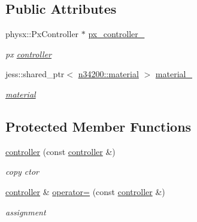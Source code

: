 \subsection*{Public Attributes}
\begin{DoxyCompactItemize}
\item 
physx::PxController $\ast$ \hyperlink{classnebula_1_1content_1_1actor_1_1physics_1_1controller_aba11f4ca929373b52f513b6b6309446a}{px\_\-controller\_\-}
\begin{DoxyCompactList}\small\item\em px \hyperlink{classnebula_1_1content_1_1actor_1_1physics_1_1controller}{controller} \item\end{DoxyCompactList}\item 
jess::shared\_\-ptr$<$ \hyperlink{classnebula_1_1content_1_1actor_1_1physics_1_1material}{n34200::material} $>$ \hyperlink{classnebula_1_1content_1_1actor_1_1physics_1_1controller_a58d0b48b283a21a2c8480f803a009351}{material\_\-}
\begin{DoxyCompactList}\small\item\em \hyperlink{classnebula_1_1content_1_1actor_1_1physics_1_1material}{material} \item\end{DoxyCompactList}\end{DoxyCompactItemize}
\subsection*{Protected Member Functions}
\begin{DoxyCompactItemize}
\item 
\hyperlink{classnebula_1_1content_1_1actor_1_1physics_1_1controller_acea67f469fce95ed2a27fe062aea026a}{controller} (const \hyperlink{classnebula_1_1content_1_1actor_1_1physics_1_1controller}{controller} \&)
\begin{DoxyCompactList}\small\item\em copy ctor \item\end{DoxyCompactList}\item 
\hyperlink{classnebula_1_1content_1_1actor_1_1physics_1_1controller}{controller} \& \hyperlink{classnebula_1_1content_1_1actor_1_1physics_1_1controller_a8ef51f82c285732fd3c5919c1019caa8}{operator=} (const \hyperlink{classnebula_1_1content_1_1actor_1_1physics_1_1controller}{controller} \&)
\begin{DoxyCompactList}\small\item\em assignment \item\end{DoxyCompactList}\end{DoxyCompactItemize}


